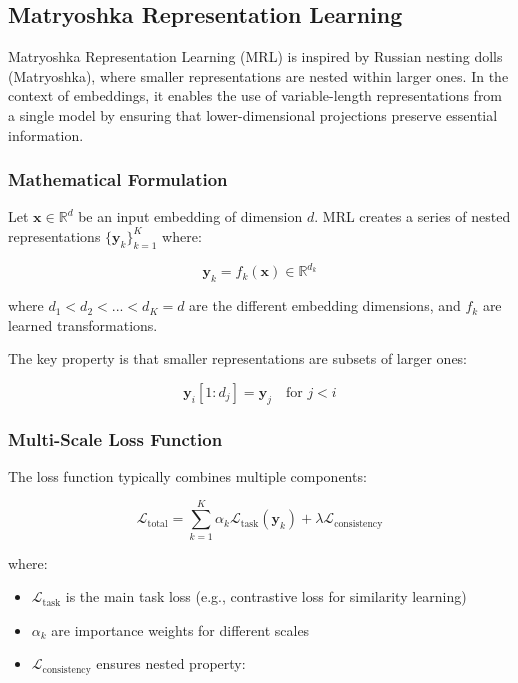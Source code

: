 \subsection{Matryoshka Representation Learning}

Matryoshka Representation Learning (MRL) is inspired by Russian nesting dolls (Matryoshka), where smaller representations are nested within larger ones. In the context of embeddings, it enables the use of variable-length representations from a single model by ensuring that lower-dimensional projections preserve essential information.

\subsubsection{Mathematical Formulation}

Let $\mathbf{x} \in \mathbb{R}^d$ be an input embedding of dimension $d$. MRL creates a series of nested representations $\{\mathbf{y}_k\}_{k=1}^K$ where:

\begin{equation}
    \mathbf{y}_k = f_k(\mathbf{x}) \in \mathbb{R}^{d_k}
\end{equation}

where $d_1 < d_2 < ... < d_K = d$ are the different embedding dimensions, and $f_k$ are learned transformations.

The key property is that smaller representations are subsets of larger ones:

\begin{equation}
    \mathbf{y}_i[1:d_j] = \mathbf{y}_j \quad \text{for } j < i
\end{equation}

\subsubsection{Multi-Scale Loss Function}

The loss function typically combines multiple components:

\begin{equation}
    \mathcal{L}_{\text{total}} = \sum_{k=1}^K \alpha_k \mathcal{L}_{\text{task}}(\mathbf{y}_k) + \lambda \mathcal{L}_{\text{consistency}}
\end{equation}

where:
\begin{itemize}
    \item $\mathcal{L}_{\text{task}}$ is the main task loss (e.g., contrastive loss for similarity learning)
    \item $\alpha_k$ are importance weights for different scales
    \item $\mathcal{L}_{\text{consistency}}$ ensures nested property:
\end{itemize}

